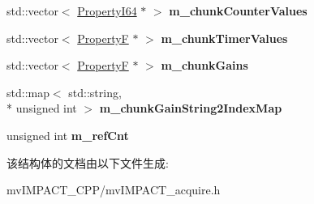 \begin{DoxyCompactItemize}
\item 
\hypertarget{structmv_i_m_p_a_c_t_1_1acquire_1_1_request_1_1_reference_counted_data_a3bc6e755720f6dd5f9eb4602cfc73d3d}{std\+::vector$<$ \hyperlink{group___common_interface_ga81749b2696755513663492664a18a893}{Property\+I64} $\ast$ $>$ {\bfseries m\+\_\+chunk\+Counter\+Values}}\label{structmv_i_m_p_a_c_t_1_1acquire_1_1_request_1_1_reference_counted_data_a3bc6e755720f6dd5f9eb4602cfc73d3d}

\item 
\hypertarget{structmv_i_m_p_a_c_t_1_1acquire_1_1_request_1_1_reference_counted_data_a99669336f335cbf7ae6c42538238d059}{std\+::vector$<$ \hyperlink{group___common_interface_gaf54865fe5a3d5cfd15f9a111b40d09f9}{Property\+F} $\ast$ $>$ {\bfseries m\+\_\+chunk\+Timer\+Values}}\label{structmv_i_m_p_a_c_t_1_1acquire_1_1_request_1_1_reference_counted_data_a99669336f335cbf7ae6c42538238d059}

\item 
\hypertarget{structmv_i_m_p_a_c_t_1_1acquire_1_1_request_1_1_reference_counted_data_afce490979b766b514babea80416a44b3}{std\+::vector$<$ \hyperlink{group___common_interface_gaf54865fe5a3d5cfd15f9a111b40d09f9}{Property\+F} $\ast$ $>$ {\bfseries m\+\_\+chunk\+Gains}}\label{structmv_i_m_p_a_c_t_1_1acquire_1_1_request_1_1_reference_counted_data_afce490979b766b514babea80416a44b3}

\item 
\hypertarget{structmv_i_m_p_a_c_t_1_1acquire_1_1_request_1_1_reference_counted_data_a6b499d30c657de086839f719c7c418f2}{std\+::map$<$ std\+::string, \\*
unsigned int $>$ {\bfseries m\+\_\+chunk\+Gain\+String2\+Index\+Map}}\label{structmv_i_m_p_a_c_t_1_1acquire_1_1_request_1_1_reference_counted_data_a6b499d30c657de086839f719c7c418f2}

\item 
\hypertarget{structmv_i_m_p_a_c_t_1_1acquire_1_1_request_1_1_reference_counted_data_a663a25073a7ba18683091f79f2c93fc1}{unsigned int {\bfseries m\+\_\+ref\+Cnt}}\label{structmv_i_m_p_a_c_t_1_1acquire_1_1_request_1_1_reference_counted_data_a663a25073a7ba18683091f79f2c93fc1}

\end{DoxyCompactItemize}


该结构体的文档由以下文件生成\+:\begin{DoxyCompactItemize}
\item 
mv\+I\+M\+P\+A\+C\+T\+\_\+\+C\+P\+P/mv\+I\+M\+P\+A\+C\+T\+\_\+acquire.\+h\end{DoxyCompactItemize}
